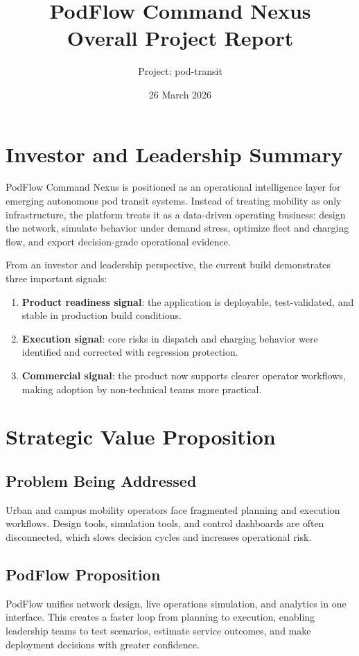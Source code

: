 \documentclass[11pt,a4paper]{article}
\title{PodFlow Command Nexus\\Overall Project Report}
\author{Project: pod-transit}
\date{26 March 2026}
\begin{document}
\maketitle
\thispagestyle{empty}

\section*{Investor and Leadership Summary}
PodFlow Command Nexus is positioned as an operational intelligence layer for emerging autonomous pod transit systems. Instead of treating mobility as only infrastructure, the platform treats it as a data-driven operating business: design the network, simulate behavior under demand stress, optimize fleet and charging flow, and export decision-grade operational evidence.

From an investor and leadership perspective, the current build demonstrates three important signals:
\begin{enumerate}
  \item \textbf{Product readiness signal}: the application is deployable, test-validated, and stable in production build conditions.
  \item \textbf{Execution signal}: core risks in dispatch and charging behavior were identified and corrected with regression protection.
  \item \textbf{Commercial signal}: the product now supports clearer operator workflows, making adoption by non-technical teams more practical.
\end{enumerate}

\section{Strategic Value Proposition}
\subsection*{Problem Being Addressed}
Urban and campus mobility operators face fragmented planning and execution workflows. Design tools, simulation tools, and control dashboards are often disconnected, which slows decision cycles and increases operational risk.

\subsection*{PodFlow Proposition}
PodFlow unifies network design, live operations simulation, and analytics in one interface. This creates a faster loop from planning to execution, enabling leadership teams to test scenarios, estimate service outcomes, and make deployment decisions with greater confidence.
\end{document}

